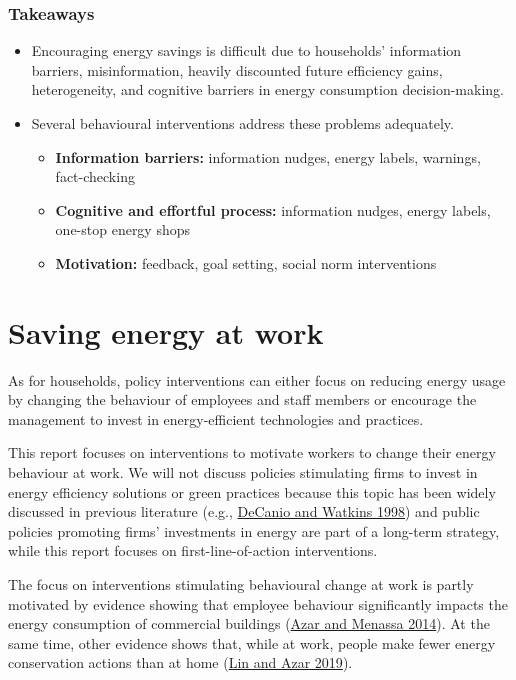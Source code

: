 \documentclass[
  11pt,
  captions=heading]{scrreport}
\begin{document}
\hypertarget{takeaways}{%
\subsection*{Takeaways}\label{takeaways}}

\begin{itemize}
\item
  Encouraging energy savings is difficult due to households' information
  barriers, misinformation, heavily discounted future efficiency gains,
  heterogeneity, and cognitive barriers in energy consumption
  decision-making.
\item
  Several behavioural interventions address these problems adequately.

  \begin{itemize}
  \item
    \textbf{Information barriers:} information nudges, energy labels,
    warnings, fact-checking
  \item
    \textbf{Cognitive and effortful process:} information nudges, energy
    labels, one-stop energy shops
  \item
    \textbf{Motivation:} feedback, goal setting, social norm
    interventions
  \end{itemize}
\end{itemize}

\hypertarget{sec:work}{%
\chapter{Saving energy at work}\label{sec:work}}

As for households, policy interventions can either focus on reducing
energy usage by changing the behaviour of employees and staff members or
encourage the management to invest in energy-efficient technologies and
practices.

This report focuses on interventions to motivate workers to change their
energy behaviour at work. We will not discuss policies stimulating firms
to invest in energy efficiency solutions or green practices because this
topic has been widely discussed in previous literature (e.g.,
\protect\hyperlink{ref-decanio1998investment}{DeCanio and Watkins 1998})
and public policies promoting firms' investments in energy are part of a
long-term strategy, while this report focuses on first-line-of-action
interventions.

The focus on interventions stimulating behavioural change at work is
partly motivated by evidence showing that employee behaviour
significantly impacts the energy consumption of commercial buildings
(\protect\hyperlink{ref-azar2014comprehensive}{Azar and Menassa 2014}).
At the same time, other evidence shows that, while at work, people make
fewer energy conservation actions than at home
(\protect\hyperlink{ref-lin2019mixing}{Lin and Azar 2019}).
\end{document}
